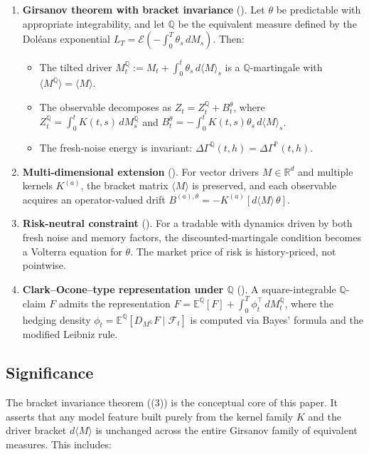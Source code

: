 \documentclass[11pt]{article}
\theoremstyle{plain}
\theoremstyle{definition}
\theoremstyle{remark}
\newcommand{\R}{\mathbb{R}}
\newcommand{\E}{\mathbb{E}}
\newcommand{\F}{\mathcal{F}}
\newcommand{\PP}{\mathbb{P}}
\newcommand{\QQ}{\mathbb{Q}}
\newcommand{\dGamma}{\Delta\Gamma}
\newcommand{\bracket}[1]{\langle #1 \rangle}
\begin{document}
\begin{enumerate}[label=(\arabic*)]
\item \textbf{Girsanov theorem with bracket invariance} ().
Let $\theta$ be predictable with appropriate integrability, and let $\QQ$ be
the equivalent measure defined by the Dol\'eans exponential
$L_T = \mathcal{E}(-\int_0^T \theta_s\,dM_s)$. Then:
\begin{itemize}
\item The tilted driver $M_t^{\QQ} := M_t + \int_0^t \theta_s\,d\bracket{M}_s$
is a $\QQ$-martingale with $\bracket{M^{\QQ}} = \bracket{M}$.
\item The observable decomposes as $Z_t = Z_t^{\QQ} + B_t^\theta$, where
$Z_t^{\QQ} = \int_0^t K(t,s)\,dM_s^{\QQ}$ and
$B_t^\theta = -\int_0^t K(t,s)\theta_s\,d\bracket{M}_s$.
\item The fresh-noise energy is invariant: $\dGamma^{\QQ}(t,h) = \dGamma^{\PP}(t,h)$.
\end{itemize}

\item \textbf{Multi-dimensional extension} ().
For vector drivers $M \in \R^d$ and multiple kernels $K^{(a)}$, the bracket
matrix $\bracket{M}$ is preserved, and each observable acquires an
operator-valued drift $B^{(a),\theta} = -K^{(a)}[d\bracket{M}\,\theta]$.

\item \textbf{Risk-neutral constraint} ().
For a tradable with dynamics driven by both fresh noise and memory factors,
the discounted-martingale condition becomes a Volterra equation for $\theta$.
The market price of risk is history-priced, not pointwise.

\item \textbf{Clark--Ocone--type representation under $\QQ$} ().
A square-integrable $\QQ$-claim $F$ admits the representation
$F = \E^{\QQ}[F] + \int_0^T \phi_t^\top\,dM_t^{\QQ}$, where the hedging
density $\phi_t = \E^{\QQ}[D_{M^{\QQ}} F \mid \F_t]$ is computed via Bayes'
formula and the modified Leibniz rule.
\end{enumerate}

\subsection{Significance}

The bracket invariance theorem ((3)) is the conceptual
core of this paper. It asserts that any model feature built purely from the
kernel family $K$ and the driver bracket $d\bracket{M}$ is unchanged across
the entire Girsanov family of equivalent measures. This includes:
\end{document}
